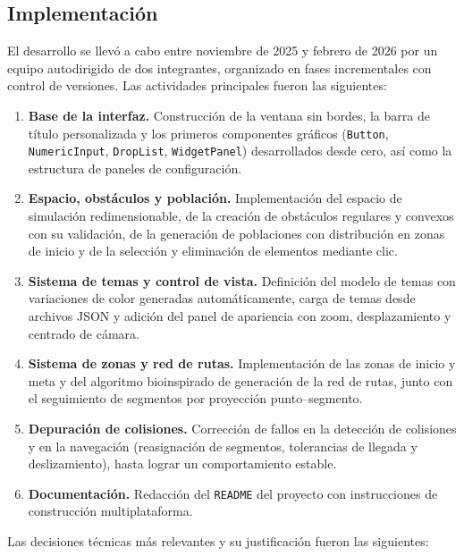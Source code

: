 \documentclass[12pt,a4paper]{article}
\begin{document}
\subsection{Implementación}

El desarrollo se llevó a cabo entre noviembre de 2025 y febrero de 2026 por un equipo autodirigido de dos integrantes, organizado en fases incrementales con control de versiones. Las actividades principales fueron las siguientes:

\begin{enumerate}
    \item \textbf{Base de la interfaz.} Construcción de la ventana sin bordes, la barra de título personalizada y los primeros componentes gráficos (\texttt{Button}, \texttt{NumericInput}, \texttt{DropList}, \texttt{WidgetPanel}) desarrollados desde cero, así como la estructura de paneles de configuración.
    \item \textbf{Espacio, obstáculos y población.} Implementación del espacio de simulación redimensionable, de la creación de obstáculos regulares y convexos con su validación, de la generación de poblaciones con distribución en zonas de inicio y de la selección y eliminación de elementos mediante clic.
    \item \textbf{Sistema de temas y control de vista.} Definición del modelo de temas con variaciones de color generadas automáticamente, carga de temas desde archivos JSON y adición del panel de apariencia con zoom, desplazamiento y centrado de cámara.
    \item \textbf{Sistema de zonas y red de rutas.} Implementación de las zonas de inicio y meta y del algoritmo bioinspirado de generación de la red de rutas, junto con el seguimiento de segmentos por proyección punto--segmento.
    \item \textbf{Depuración de colisiones.} Corrección de fallos en la detección de colisiones y en la navegación (reasignación de segmentos, tolerancias de llegada y deslizamiento), hasta lograr un comportamiento estable.
    \item \textbf{Documentación.} Redacción del \texttt{README} del proyecto con instrucciones de construcción multiplataforma.
\end{enumerate}

Las decisiones técnicas más relevantes y su justificación fueron las siguientes:
\end{document}
